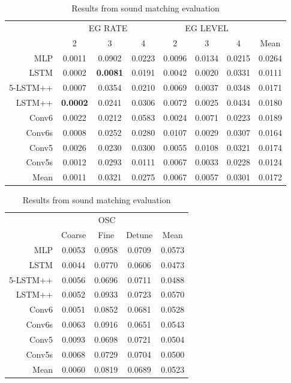 \begin{table}[t]
\centering
\caption{Results from sound matching evaluation}
\label{tbl:param_eval_eg}
\begin{tabular}{r|ccc|ccc|c}
\toprule
{} & \multicolumn{3}{c}{EG RATE} & \multicolumn{3}{c}{EG LEVEL} & {} \\
{} & 2 & 3 & 4 & 2 & 3 & 4 & Mean \\
\midrule
MLP      &     0.0011 &     0.0902 &     0.0223 &      0.0096 &      0.0134 &      0.0215 &   0.0264 \\
LSTM     &     0.0002 &     \textbf{0.0081} &     0.0191 &      0.0042 &      0.0020 &      0.0331 &   0.0111 \\
5-LSTM++ &     0.0007 &     0.0354 &     0.0210 &      0.0069 &      0.0037 &      0.0348 &   0.0171 \\
LSTM++   &     \textbf{0.0002} &     0.0241 &     0.0306 &      0.0072 &      0.0025 &      0.0434 &   0.0180 \\
Conv6    &     0.0022 &     0.0212 &     0.0583 &      0.0024 &      0.0071 &      0.0223 &   0.0189 \\
Conv6s   &     0.0008 &     0.0252 &     0.0280 &      0.0107 &      0.0029 &      0.0307 &   0.0164 \\
Conv5    &     0.0026 &     0.0230 &     0.0300 &      0.0055 &      0.0108 &      0.0321 &   0.0174 \\
Conv5s   &     0.0012 &     0.0293 &     0.0111 &      0.0067 &      0.0033 &      0.0228 &   0.0124 \\
\midrule
Mean  &     0.0011 &     0.0321 &     0.0275 &      0.0067 &      0.0057 &      0.0301 &   0.0172 \\
\bottomrule
\end{tabular}
\end{table}

\begin{table}[t]
\centering
\caption{Results from sound matching evaluation}
\label{tbl:param_eval_osc}
\begin{tabular}{r|ccc|c}
\toprule
{} & \multicolumn{3}{c}{OSC} & {} \\
{} & Coarse & Fine & Detune & Mean \\
\midrule
MLP      &    0.0053 &  0.0958 &      0.0709 & 0.0573 \\
LSTM     &    0.0044 &  0.0770 &      0.0606 & 0.0473 \\
5-LSTM++ &    0.0056 &  0.0696 &      0.0711 & 0.0488 \\
LSTM++   &    0.0052 &  0.0933 &      0.0723 & 0.0570 \\
Conv6    &    0.0051 &  0.0852 &      0.0681 & 0.0528 \\
Conv6s   &    0.0063 &  0.0916 &      0.0651 & 0.0543 \\
Conv5    &    0.0093 &  0.0698 &      0.0721 & 0.0504 \\
Conv5s   &    0.0068 &  0.0729 &      0.0704 & 0.0500 \\
\midrule
Mean     &    0.0060 &  0.0819 &      0.0689 & 0.0523 \\
\bottomrule
\end{tabular}
\end{table}

